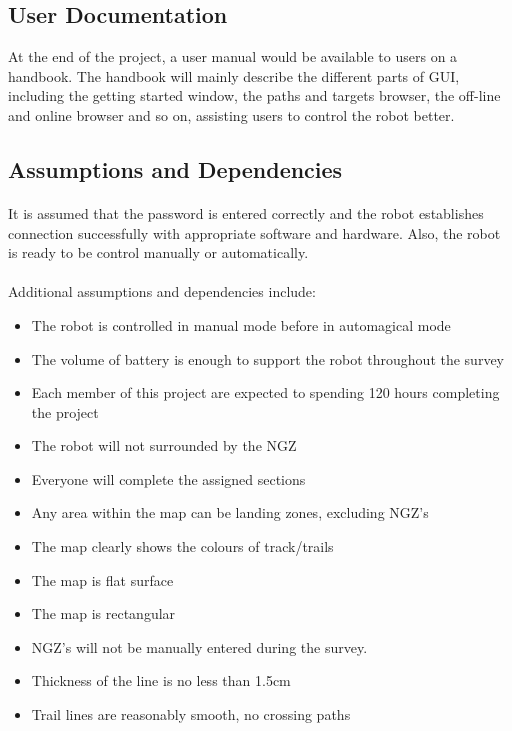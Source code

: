\documentclass[10pt,a4paper,titlepage]{article}
\begin{document}
	\subsection{User Documentation}
	At the end of the project, a user manual would be available to users on a handbook. The handbook will mainly describe the different parts of GUI, including the getting started window, the paths and targets browser, the off-line and online browser and so on, assisting users to control the robot better.
	
	\subsection{Assumptions and Dependencies}
	\paragraph{}
	It is assumed that the password is entered correctly and the robot establishes connection successfully with appropriate software and hardware. Also, the robot is ready to be control manually or automatically.  
	\paragraph{}
	Additional assumptions and dependencies include: 
	\begin{itemize}
		\item The robot is controlled in manual mode before in automagical mode
		\item The volume of battery is enough to support the robot throughout the survey
		\item Each member of this project are expected to spending 120 hours completing the project
		\item The robot will not surrounded by the NGZ
		\item Everyone will complete the assigned sections 
		\item Any area within the map can be landing zones, excluding NGZ's
		\item The map clearly shows the colours of track/trails
		\item The map is flat surface
		\item The map is rectangular
		\item NGZ's will not be manually entered during the survey.
		\item Thickness of the line is no less than 1.5cm
		\item Trail lines are reasonably smooth, no crossing paths
	\end{itemize}
	
\end{document}

